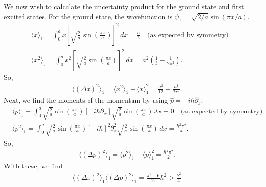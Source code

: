 \documentclass{article}
\theoremstyle{definition}
\newcommand{\p}{\partial}
\newcommand{\f}[2]{\frac{#1}{#2}}
\newcommand{\lp}{\left(}
\newcommand{\rp}{\right)}
\newcommand{\lb}{\left[}
\newcommand{\rb}{\right]}
\begin{document}
We now wish to calculate the uncertainty product for the ground state and first excited states. For the ground state, the wavefunction is $\psi_1 = \sqrt{2/a}\sin(\pi x/a)$. 
\begin{align*}
&\langle x  \rangle_1 = \int_0^a x \lb \sqrt{\f{2}{a}}\sin\lp \f{\pi x }{a} \rp\rb^2\,dx = \f{a}{2} \quad \text{(as expected by symmetry)}\\
&\langle x^2  \rangle_1 = \int_0^a x^2 \lb \sqrt{\f{2}{a}}\sin\lp \f{\pi x }{a} \rp\rb^2\,dx = a^2\lp \f{1}{3} - \f{1}{2\pi^2}\rp.
\end{align*}
So,
\begin{align*}
\langle (\Delta x)^2 \rangle_1 = \langle x^2 \rangle_1 - \langle x \rangle^2_1 =  \f{a^2}{12} - \f{a^2}{2\pi^2}.
\end{align*}
Next, we find the moments of the momentum by using $\hat p  = -i\hbar \p_x$:
\begin{align*}
&\langle p  \rangle_1 = \int_0^a \sqrt{\f{2}{a}}\sin\lp \f{\pi x }{a} \rp
\lb -i\hbar \p_x \rb\sqrt{\f{2}{a}}\sin\lp \f{\pi x }{a} \rp\,dx = 0 \quad \text{(as expected by symmetry)}\\
&\langle p^2  \rangle_1 = \int_0^a \sqrt{\f{2}{a}}\sin\lp \f{\pi x }{a} \rp
\lb -i\hbar \rb^2 \p^2_x \sqrt{\f{2}{a}}\sin\lp \f{\pi x }{a} \rp\,dx = \f{\hbar^2 \pi^2}{a}.
\end{align*}
So,
\begin{align*}
\langle (\Delta p)^2 \rangle_1 = \langle p^2 \rangle_1 - \langle p \rangle^2_1 =  \f{\hbar^2 \pi^2}{2}.
\end{align*}
With these, we find 
\begin{align*}
\boxed{\langle (\Delta x)^2 \rangle_1\langle (\Delta p)^2 \rangle_1 = \f{\pi^2-6}{12} \hbar^2 > \f{\hbar^2}{4}}
\end{align*}
\end{document}
